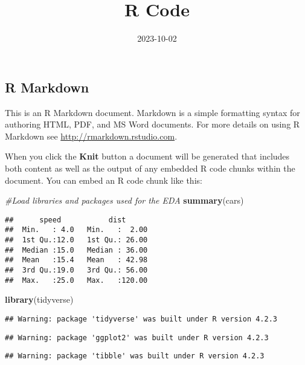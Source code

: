 \documentclass[
]{article}
\title{R Code}
\author{}
\date{\vspace{-2.5em}2023-10-02}
\newenvironment{Shaded}{\begin{snugshade}}{\end{snugshade}}
\newcommand{\CommentTok}[1]{\textcolor[rgb]{0.56,0.35,0.01}{\textit{#1}}}
\newcommand{\FunctionTok}[1]{\textcolor[rgb]{0.13,0.29,0.53}{\textbf{#1}}}
\newcommand{\NormalTok}[1]{#1}
\begin{document}
\maketitle

\hypertarget{r-markdown}{%
\subsection{R Markdown}\label{r-markdown}}

This is an R Markdown document. Markdown is a simple formatting syntax
for authoring HTML, PDF, and MS Word documents. For more details on
using R Markdown see \url{http://rmarkdown.rstudio.com}.

When you click the \textbf{Knit} button a document will be generated
that includes both content as well as the output of any embedded R code
chunks within the document. You can embed an R code chunk like this:

\begin{Shaded}
\begin{Highlighting}[]
\CommentTok{\#Load libraries and packages used for the EDA}
\FunctionTok{summary}\NormalTok{(cars)}
\end{Highlighting}
\end{Shaded}

\begin{verbatim}
##      speed           dist       
##  Min.   : 4.0   Min.   :  2.00  
##  1st Qu.:12.0   1st Qu.: 26.00  
##  Median :15.0   Median : 36.00  
##  Mean   :15.4   Mean   : 42.98  
##  3rd Qu.:19.0   3rd Qu.: 56.00  
##  Max.   :25.0   Max.   :120.00
\end{verbatim}

\begin{Shaded}
\begin{Highlighting}[]
\FunctionTok{library}\NormalTok{(tidyverse)}
\end{Highlighting}
\end{Shaded}

\begin{verbatim}
## Warning: package 'tidyverse' was built under R version 4.2.3
\end{verbatim}

\begin{verbatim}
## Warning: package 'ggplot2' was built under R version 4.2.3
\end{verbatim}

\begin{verbatim}
## Warning: package 'tibble' was built under R version 4.2.3
\end{verbatim}
\end{document}
